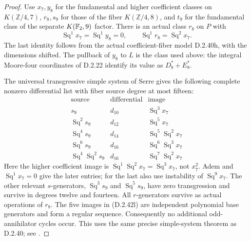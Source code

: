 \begin{proof}
Use $x_7,y_8$ for the fundamental and higher coefficient classes
on $K(\mathbb Z/4,7)$, $r_8,s_9$ for those of the fiber
$K(\mathbb Z/4,8)$, and $t_9$ for the fundamental class of
the separate $K(\mathbb F_2,9)$ factor.
There is an actual class $r_8$ on $P$ with
\[
 \operatorname{Sq}^1x_7=\operatorname{Sq}^1y_8=0,
 \qquad\operatorname{Sq}^1r_8=\operatorname{Sq}^2x_7.
 \tag{D.2.42k}
\]
The last identity follows from the actual coefficient-fiber
model D.2.40h, with the dimensions shifted.  The pullback of
$y_8$ to $L$ is the class used above: the integral Moore-four
coordinates of D.2.22 identify its value as $D_8^*+E_8^*$.

The universal transgressive simple system of Serre gives the
following complete nonzero differential list with fiber source
degree at most fifteen:
\[
\begin{array}{c|c|c}
\text{source}&\text{differential}&\text{image}\\ \hline
s_9&d_{10}&\operatorname{Sq}^3x_7\\
\operatorname{Sq}^2s_9&d_{12}&\operatorname{Sq}^5x_7\\
\operatorname{Sq}^4s_9&d_{14}&
             \operatorname{Sq}^5\operatorname{Sq}^2x_7\\
\operatorname{Sq}^6s_9&d_{16}&
             \operatorname{Sq}^6\operatorname{Sq}^3x_7\\
\operatorname{Sq}^4\operatorname{Sq}^2s_9&d_{16}&
             \operatorname{Sq}^7\operatorname{Sq}^2x_7
\end{array}
\tag{D.2.42l}
\]
Here the higher coefficient image is
$\operatorname{Sq}^1\operatorname{Sq}^2x_7
=\operatorname{Sq}^3x_7$, not $x_7^2$.
Adem and $\operatorname{Sq}^1x_7=0$ give the later entries;
for the last also use instability of $\operatorname{Sq}^9x_7$.
The other relevant $s$-generators,
$\operatorname{Sq}^3s_9$ and $\operatorname{Sq}^5s_9$,
have zero transgression and survive in degrees twelve and
fourteen.  All $r$-generators survive as actual operations of
$r_8$.  The five images in \textup{(D.2.42l)} are independent
polynomial base generators and form a regular sequence.
Consequently no additional odd-annihilator cycles occur.
This uses the same precise simple-system theorem as D.2.40;
see \cite[\S2, no.~7, pp.~201--203, and no.~11,
pp.~204--205]{I_Serre1953}.


\end{proof}
